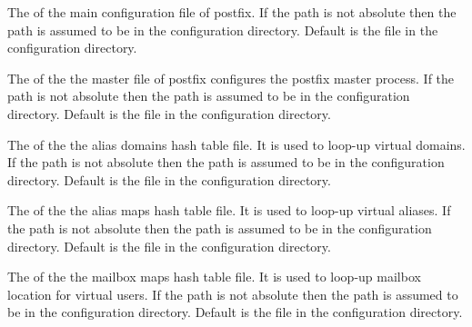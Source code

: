 
The  of the main configuration file of postfix.
If the path is not absolute then the path is assumed to be
in the configuration directory.
Default is the file  in the configuration directory.


The  of the the master file of postfix configures
the postfix master process. 
If the path is not absolute then the path is assumed to be
in the configuration directory.
Default is the file  in the configuration directory.


The  of the the alias domains hash table file. It is used to loop-up
virtual domains. If the path is not absolute then the path is assumed to be
in the configuration directory. 
Default is the file  in the configuration directory.


The  of the the alias maps hash table file. It is used to loop-up
virtual aliases. If the path is not absolute then the path is assumed to be
in the configuration directory. 
Default is the file  in the configuration directory.


The  of the the mailbox maps hash table file. It is used to loop-up
mailbox location for virtual users. 
If the path is not absolute then the path is assumed to be in the 
configuration directory. 
Default is the file  in the configuration directory.


